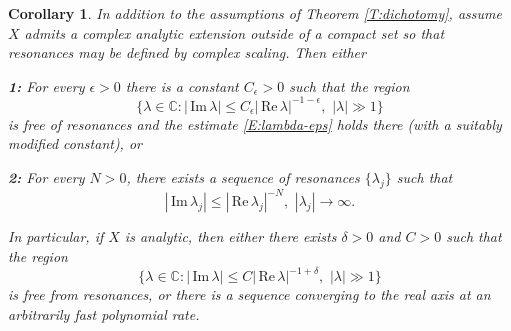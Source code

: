 \documentclass[twoside, final]{amsart}
\newtheorem{corollary}[proposition]{Corollary}
\theoremstyle{definition}
\numberwithin{equation}{section}
\begin{document}
\begin{corollary}
In addition to the assumptions of Theorem 
\ref{T:dichotomy}, assume $X$ admits a complex analytic extension
outside of a compact set so that resonances may be defined by complex
scaling.  Then either

{\bf 1:} For every $\epsilon>0$ there is a constant $C_\epsilon>0$ such that
the region
\[
\{ \lambda \in {{\mathbb C}} : | {\,\mathrm{Im}\,} \lambda | {\leqslant} C_\epsilon | {\,\mathrm{Re}\,} \lambda
|^{-1-\epsilon}, \,\, | \lambda | \gg 1 \}
\]
is free of resonances and the estimate \eqref{E:lambda-eps} holds
there (with a suitably modified constant), or

{\bf 2:} For every $N>0$, there exists a sequence of resonances $\{
\lambda_j \}$ such that
\[
| {\,\mathrm{Im}\,} \lambda_j | {\leqslant} | {\,\mathrm{Re}\,} \lambda_j |^{-N}, \,\, | \lambda_j | \to
\infty.
\]

In particular, if $X$ is analytic, then either there exists $\delta>0$ and
$C>0$ such that the region 
\[
\{  \lambda \in {{\mathbb C}} : | {\,\mathrm{Im}\,} \lambda | {\leqslant} C | {\,\mathrm{Re}\,} \lambda
|^{-1+\delta}, \,\, | \lambda | \gg 1 \}
\]
is free from resonances, or there is a sequence converging to the real
axis at an arbitrarily fast polynomial rate.

\end{corollary}
\end{document}
